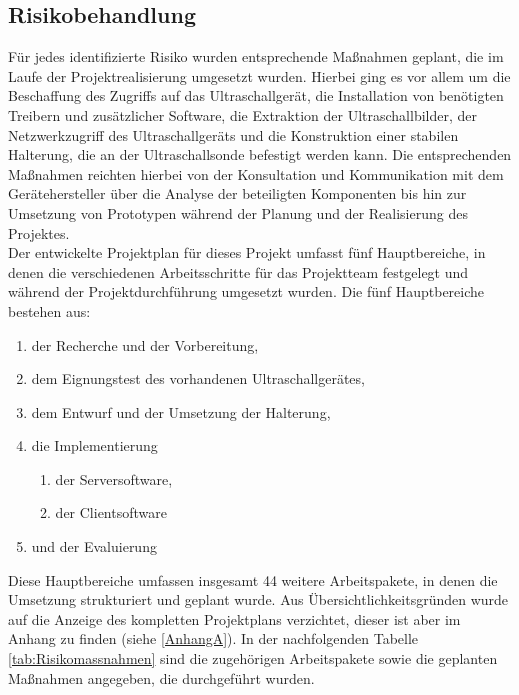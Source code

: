\subsection{Risikobehandlung}
Für jedes identifizierte Risiko wurden entsprechende Maßnahmen geplant, die im Laufe der Projektrealisierung umgesetzt wurden. Hierbei ging es vor allem um die Beschaffung des Zugriffs auf das Ultraschallgerät, die Installation von benötigten Treibern und zusätzlicher Software, die Extraktion der Ultraschallbilder, der Netzwerkzugriff des Ultraschallgeräts und die Konstruktion einer stabilen Halterung, die an der Ultraschallsonde befestigt werden kann. Die entsprechenden Maßnahmen reichten hierbei von der Konsultation und Kommunikation mit dem Gerätehersteller über die Analyse der beteiligten Komponenten bis hin zur Umsetzung von Prototypen während der Planung und der Realisierung des Projektes. \\ 
Der entwickelte Projektplan für dieses Projekt umfasst fünf Hauptbereiche, in denen die verschiedenen Arbeitsschritte für das Projektteam festgelegt  und während der Projektdurchführung umgesetzt wurden. Die fünf Hauptbereiche bestehen aus: 
\begin{enumerate}
\item der Recherche und der Vorbereitung,
\item dem Eignungstest des vorhandenen Ultraschallgerätes,
\item dem Entwurf und der Umsetzung der Halterung,
\item die Implementierung 
	\begin{enumerate}
         \item der Serversoftware,
         \item der Clientsoftware
	\end{enumerate}
\item und der Evaluierung
\end{enumerate}

Diese Hauptbereiche umfassen insgesamt 44 weitere Arbeitspakete, in denen die Umsetzung strukturiert und geplant wurde. Aus Übersichtlichkeitsgründen wurde auf die Anzeige des kompletten Projektplans verzichtet, dieser ist aber im Anhang zu finden (siehe \ref{AnhangA}). In der nachfolgenden Tabelle \ref{tab:Risikomassnahmen} sind die zugehörigen Arbeitspakete sowie die geplanten Maßnahmen angegeben, die durchgeführt wurden.

